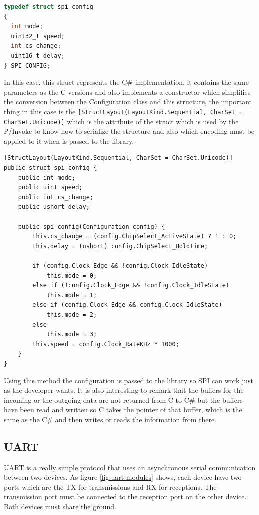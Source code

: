 \begin{lstlisting}[language=C, caption={IOSharp.h - spi\_config struct}]
typedef struct spi_config
{
  int mode;
  uint32_t speed;
  int cs_change;
  uint16_t delay;
} SPI_CONFIG;
\end{lstlisting}

In this case, this struct represents the C\# implementation, it contains the same parameters as the C versions and also implements a constructor which simplifies the conversion between the Configuration class and this structure, the important thing in this case is the \verb![StructLayout(LayoutKind.Sequential, CharSet = CharSet.Unicode)]! which is the attribute of the struct which is used by the P/Invoke to know how to serialize the structure and also which encoding must be applied to it when is passed to the library.

\begin{lstlisting}[language=CSharp, caption={SPI.cs - spi\_config struct}]
[StructLayout(LayoutKind.Sequential, CharSet = CharSet.Unicode)]
public struct spi_config {
    public int mode;
    public uint speed;
    public int cs_change;
    public ushort delay;

    public spi_config(Configuration config) {
        this.cs_change = (config.ChipSelect_ActiveState) ? 1 : 0;
        this.delay = (ushort) config.ChipSelect_HoldTime;

        if (config.Clock_Edge && !config.Clock_IdleState)
            this.mode = 0;
        else if (!config.Clock_Edge && !config.Clock_IdleState)
            this.mode = 1;
        else if (config.Clock_Edge && config.Clock_IdleState)
            this.mode = 2;
        else
            this.mode = 3;
        this.speed = config.Clock_RateKHz * 1000;
    }
}
\end{lstlisting}

Using this method the configuration is passed to the library so SPI can work just as the developer wants. It is also interesting to remark that the buffers for the incoming or the outgoing data are not returned from C to C\# but the buffers have been read and written so C takes the pointer of that buffer, which is the same as the C\# and then writes or reads the information from there. 

\subsection{UART}\label{SS:IOSharp-UART}
UART is a really simple protocol that uses an asynchronous serial communication between two devices. As figure \ref{fig:uart-modules} shows, each device have two ports which are the \gls{TX} for transmissions and \gls{RX} for receptions. The transmission port must be connected to the reception port on the other device. Both devices must share the ground.

